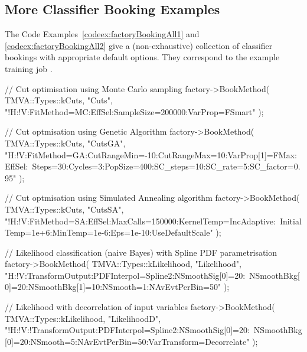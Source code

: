 \begin{appendix}

\section{More Classifier Booking Examples}
\label{sec:appendix:booking}

The Code Examples~\ref{codeex:factoryBookingAll1} and \ref{codeex:factoryBookingAll2}
give a (non-exhaustive) collection of classifier bookings with appropriate 
default options. They correspond to the example training job .
\begin{codeexample}
\begin{tmvacode}
// Cut optimisation using Monte Carlo sampling
factory->BookMethod( TMVA::Types::kCuts, "Cuts", 
    "!H:!V:FitMethod=MC:EffSel:SampleSize=200000:VarProp=FSmart" );

// Cut optmisation using Genetic Algorithm
factory->BookMethod( TMVA::Types::kCuts, "CutsGA",
    "H:!V:FitMethod=GA:CutRangeMin=-10:CutRangeMax=10:VarProp[1]=FMax:EffSel:\
     Steps=30:Cycles=3:PopSize=400:SC_steps=10:SC_rate=5:SC_factor=0.95" );

// Cut optmisation using Simulated Annealing algorithm
factory->BookMethod( TMVA::Types::kCuts, "CutsSA",
    "!H:!V:FitMethod=SA:EffSel:MaxCalls=150000:KernelTemp=IncAdaptive:\
     InitialTemp=1e+6:MinTemp=1e-6:Eps=1e-10:UseDefaultScale" );

// Likelihood classification (naive Bayes) with Spline PDF parametrisation
factory->BookMethod( TMVA::Types::kLikelihood, "Likelihood", 
    "H:!V:TransformOutput:PDFInterpol=Spline2:NSmoothSig[0]=20:\
     NSmoothBkg[0]=20:NSmoothBkg[1]=10:NSmooth=1:NAvEvtPerBin=50" ); 

// Likelihood with decorrelation of input variables
factory->BookMethod( TMVA::Types::kLikelihood, "LikelihoodD", 
    "!H:!V:!TransformOutput:PDFInterpol=Spline2:NSmoothSig[0]=20:\
     NSmoothBkg[0]=20:NSmooth=5:NAvEvtPerBin=50:VarTransform=Decorrelate" ); 


\end{tmvacode}
\end{codeexample}
\end{appendix}
